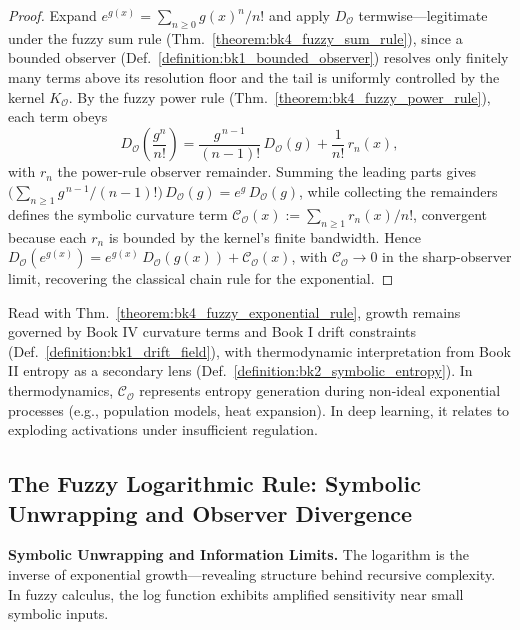 \begin{proof}
\label{proof:bk4_fuzzy_exponential_rule}
\leavevmode
Expand $e^{g(x)} = \sum_{n \ge 0} g(x)^n/n!$ and apply $D_{\mathcal{O}}$ termwise---legitimate under the fuzzy sum rule (Thm.~\ref{theorem:bk4_fuzzy_sum_rule}), since a bounded observer (Def.~\ref{definition:bk1_bounded_observer}) resolves only finitely many terms above its resolution floor and the tail is uniformly controlled by the kernel $K_{\mathcal{O}}$. By the fuzzy power rule (Thm.~\ref{theorem:bk4_fuzzy_power_rule}), each term obeys
\[
D_{\mathcal{O}}\!\left(\frac{g^n}{n!}\right) = \frac{g^{\,n-1}}{(n-1)!}\,D_{\mathcal{O}}(g) + \frac{1}{n!}\,r_n(x),
\]
with $r_n$ the power-rule observer remainder. Summing the leading parts gives $\bigl(\sum_{n \ge 1} g^{\,n-1}/(n-1)!\bigr)\,D_{\mathcal{O}}(g) = e^{g}\,D_{\mathcal{O}}(g)$, while collecting the remainders defines the symbolic curvature term $\mathcal{C}_{\mathcal{O}}(x) := \sum_{n \ge 1} r_n(x)/n!$, convergent because each $r_n$ is bounded by the kernel's finite bandwidth. Hence $D_{\mathcal{O}}(e^{g(x)}) = e^{g(x)}\,D_{\mathcal{O}}(g(x)) + \mathcal{C}_{\mathcal{O}}(x)$, with $\mathcal{C}_{\mathcal{O}} \to 0$ in the sharp-observer limit, recovering the classical chain rule for the exponential.
\end{proof}

\begin{scholium}
\label{scholium:bk4_fuzzy_exponential_growth}
Read with Thm.~\ref{theorem:bk4_fuzzy_exponential_rule}, growth remains governed by Book IV curvature terms and Book I drift constraints (Def.~\ref{definition:bk1_drift_field}), with thermodynamic interpretation from Book II entropy as a secondary lens (Def.~\ref{definition:bk2_symbolic_entropy}).
In thermodynamics, $\mathcal{C}_{\mathcal{O}}$ represents entropy generation during non-ideal exponential processes (e.g., population models, heat expansion). In deep learning, it relates to exploding activations under insufficient regulation.
\end{scholium}

\subsection{The Fuzzy Logarithmic Rule: Symbolic Unwrapping and Observer Divergence}
\label{subsec:bk4_fuzzy_logarithmic_rule}

\textbf{Symbolic Unwrapping and Information Limits.} The logarithm is the inverse of exponential growth---revealing structure behind recursive complexity. In fuzzy calculus, the log function exhibits amplified sensitivity near small symbolic inputs.


